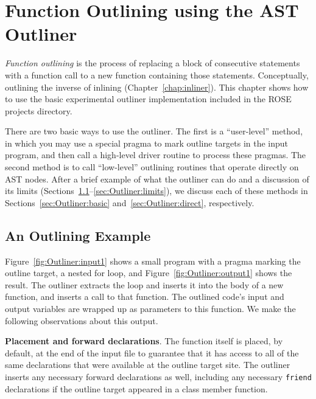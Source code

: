\chapter{Function Outlining using the AST Outliner}
\label{chap:outliner}

\emph{Function outlining} is the process of replacing a block of
consecutive statements with a function call to a new function
containing those statements. Conceptually, outlining the inverse of
inlining (Chapter~\ref{chap:inliner}). This chapter shows how to use
the basic experimental outliner implementation included in the ROSE projects
directory.

There are two basic ways to use the outliner. The first is a
``user-level'' method, in which you may use a special pragma to mark
outline targets in the input program, and then call a high-level
driver routine to process these pragmas. The second method is to call
``low-level'' outlining routines that operate directly on AST nodes.
After a brief example of what the outliner can do and a discussion
of its limits
(Sections~\ref{sec:Outliner:example}--\ref{sec:Outliner:limits}),
we discuss each of these methods in
Sections~\ref{sec:Outliner:basic} and~\ref{sec:Outliner:direct},
respectively.

\section{An Outlining Example}
\label{sec:Outliner:example}

Figure~\ref{fig:Outliner:input1} shows a small program with a
pragma marking the outline target, a nested for loop, and
Figure~\ref{fig:Outliner:output1} shows the result. The outliner
extracts the loop and inserts it into the body of a new function, and
inserts a call to that function. The outlined code's input and output
variables are wrapped up as parameters to this function. We make the
following observations about this output.

\textbf{Placement and forward declarations}. The function itself is
placed, by default, at the end of the input file to guarantee that it
has access to all of the same declarations that were available at the
outline target site. The outliner inserts any necessary forward
declarations as well, including any necessary \texttt{friend}
declarations if the outline target appeared in a class member
function.

